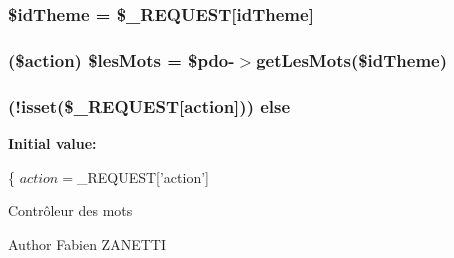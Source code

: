 \subsubsection[{\$id\+Theme}]{\setlength{\rightskip}{0pt plus 5cm}\$id\+Theme = \$\+\_\+\+R\+E\+Q\+U\+E\+S\+T\mbox{[}\textquotesingle{}id\+Theme\textquotesingle{}\mbox{]}}\label{c__gerer_mots_8php_a15ce66af1239b15a9d86dcefa7372521}
\hypertarget{c__gerer_mots_8php_a1b34fbfde3a3b8a2b9ae5479a19d2e9b}{}
\subsubsection[{\$les\+Mots}]{ (\$action) \$les\+Mots = \$pdo-\/$>$get\+Les\+Mots(\$id\+Theme)}\label{c__gerer_mots_8php_a1b34fbfde3a3b8a2b9ae5479a19d2e9b}
\hypertarget{c__gerer_mots_8php_a9eb9d4aea63ebe6f016e561ea73b210a}{}
\subsubsection[{else}]{ (!isset(\$\+\_\+\+R\+E\+Q\+U\+E\+S\+T\mbox{[}\textquotesingle{}action\textquotesingle{}\mbox{]})) else}\label{c__gerer_mots_8php_a9eb9d4aea63ebe6f016e561ea73b210a}
{\bfseries Initial value\+:}
\begin{DoxyCode}
\{
    $action = $\_REQUEST[\textcolor{stringliteral}{'action'}]
\end{DoxyCode}
Contrôleur des mots

\begin{DoxyAuthor}{Author}
Fabien Z\+A\+N\+E\+T\+T\+I 
\end{DoxyAuthor}
